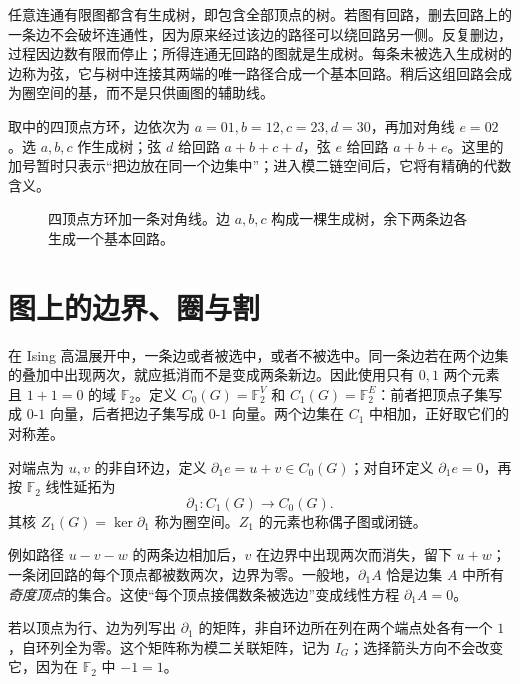 任意连通有限图都含有生成树，即包含全部顶点的树。若图有回路，删去回路上的一条边不会破坏连通性，因为原来经过该边的路径可以绕回路另一侧。反复删边，过程因边数有限而停止；所得连通无回路的图就是生成树。每条未被选入生成树的边称为弦，它与树中连接其两端的唯一路径合成一个基本回路。稍后这组回路会成为圈空间的基，而不是只供画图的辅助线。

取中的四顶点方环，边依次为 $a=01,b=12,c=23,d=30$，再加对角线 $e=02$。选 $a,b,c$ 作生成树；弦 $d$ 给回路 $a+b+c+d$，弦 $e$ 给回路 $a+b+e$。这里的加号暂时只表示“把边放在同一个边集中”；进入模二链空间后，它将有精确的代数含义。

\begin{figure}[htbp]
\centering

\caption{四顶点方环加一条对角线。边 $a,b,c$ 构成一棵生成树，余下两条边各生成一个基本回路。}
\label{fig:advanced-five-edge-graph}
\end{figure}

\section{图上的边界、圈与割}

在 Ising 高温展开中，一条边或者被选中，或者不被选中。同一条边若在两个边集的叠加中出现两次，就应抵消而不是变成两条新边。因此使用只有 $0,1$ 两个元素且 $1+1=0$ 的域 $\mathbb F_2$。定义 $C_0(G)=\mathbb F_2^V$ 和 $C_1(G)=\mathbb F_2^E$：前者把顶点子集写成 $0$-$1$ 向量，后者把边子集写成 $0$-$1$ 向量。两个边集在 $C_1$ 中相加，正好取它们的对称差。

\begin{definition}[边界算子与圈空间]
对端点为 $u,v$ 的非自环边，定义 $\partial_1e=u+v\in C_0(G)$；对自环定义 $\partial_1e=0$，再按 $\mathbb F_2$ 线性延拓为
\begin{equation}
\partial_1:C_1(G)\longrightarrow C_0(G).
\label{eq:advanced-graph-boundary-primer}
\end{equation}
其核 $Z_1(G)=\ker\partial_1$ 称为圈空间。$Z_1$ 的元素也称偶子图或闭链。
\end{definition}

例如路径 $u\!\! -\!\! v\!\! -\!\! w$ 的两条边相加后，$v$ 在边界中出现两次而消失，留下 $u+w$；一条闭回路的每个顶点都被数两次，边界为零。一般地，$\partial_1A$ 恰是边集 $A$ 中所有\emph{奇度顶点}的集合。这使“每个顶点接偶数条被选边”变成线性方程 $\partial_1A=0$。

若以顶点为行、边为列写出 $\partial_1$ 的矩阵，非自环边所在列在两个端点处各有一个 $1$，自环列全为零。这个矩阵称为模二关联矩阵，记为 $I_G$；选择箭头方向不会改变它，因为在 $\mathbb F_2$ 中 $-1=1$。

